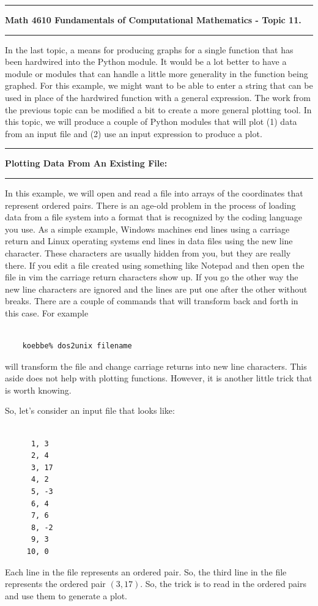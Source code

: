 \documentclass[10pt,fleqn]{article}
\begin{document}
\vskip0.1in\hrule\vskip0.1in \noindent
{\bf Math 4610 Fundamentals of Computational Mathematics  - Topic 11.}
\vskip0.1in\hrule\vskip0.1in \noindent
In the last topic, a means for producing graphs for a single function that has
been hardwired into the Python module. It would be a lot better to have a module
or modules that can handle a little more generality in the function being
graphed. For this example, we might want to be able to enter a string that can
be used in place of the hardwired function with a general expression. The work
from the previous topic can be modified a bit to create a more general plotting
tool. In this topic, we will produce a couple of Python modules that will plot
(1) data from an input file and (2) use an input expression to produce a plot.
\vskip0.1in\hrule\vskip0.1in\noindent
{\bf Plotting Data From An Existing File: } 
\vskip0.1in\hrule\vskip0.1in\noindent
In this example, we will open and read a file into arrays of the coordinates
that represent ordered pairs. There is an age-old problem in the process of
loading data from a file system into a format that is recognized by the coding
language you use. As a simple example, Windows machines end lines using a
carriage return and Linux operating systems end lines in data files using the
new line character. These characters are usually hidden from you, but they are
really there. If you edit a file created using something like Notepad and then
open the file in vim the carriage return characters show up. If you go the other
way the new line characters are ignored and the lines are put one after the
other without breaks. There are a couple of commands that will transform back
and forth in this case. For example
\begin{verbatim}

    koebbe% dos2unix filename

\end{verbatim}
will transform the file and change carriage returns into new line characters.
This aside does not help with plotting functions. However, it is another little
trick that is worth knowing.

So, let's consider an input file that looks like:
\begin{verbatim}

      1, 3
      2, 4
      3, 17
      4, 2
      5, -3
      6, 4
      7, 6
      8, -2
      9, 3
     10, 0

\end{verbatim}
Each line in the file represents an ordered pair. So, the third line in the file
represents the ordered pair \((3, 17)\). So, the trick is to read in the ordered
pairs and use them to generate a plot.
\end{document}
